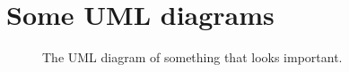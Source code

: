

\chapter{Some UML diagrams}

\begin{figure}
  \centering
  \caption{The UML diagram of something that looks important.}
\label{fig:someuml}
\end{figure}